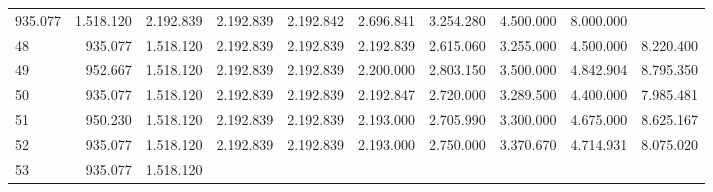 \begin{tabular}{llllllllll}
  \multicolumn{1}{|r}{935.077} &
  \multicolumn{1}{r}{1.518.120} &
  \multicolumn{1}{r}{2.192.839} &
  \multicolumn{1}{r}{2.192.839} &
  \multicolumn{1}{r}{2.192.842} &
  \multicolumn{1}{r}{2.696.841} &
  \multicolumn{1}{r}{3.254.280} &
  \multicolumn{1}{r}{4.500.000} &
  \multicolumn{1}{r}{8.000.000} \\
\multicolumn{1}{l}{\hspace{1em}48} &
  \multicolumn{1}{|r}{935.077} &
  \multicolumn{1}{r}{1.518.120} &
  \multicolumn{1}{r}{2.192.839} &
  \multicolumn{1}{r}{2.192.839} &
  \multicolumn{1}{r}{2.192.839} &
  \multicolumn{1}{r}{2.615.060} &
  \multicolumn{1}{r}{3.255.000} &
  \multicolumn{1}{r}{4.500.000} &
  \multicolumn{1}{r}{8.220.400} \\
\multicolumn{1}{l}{\hspace{1em}49} &
  \multicolumn{1}{|r}{952.667} &
  \multicolumn{1}{r}{1.518.120} &
  \multicolumn{1}{r}{2.192.839} &
  \multicolumn{1}{r}{2.192.839} &
  \multicolumn{1}{r}{2.200.000} &
  \multicolumn{1}{r}{2.803.150} &
  \multicolumn{1}{r}{3.500.000} &
  \multicolumn{1}{r}{4.842.904} &
  \multicolumn{1}{r}{8.795.350} \\
\multicolumn{1}{l}{\hspace{1em}50} &
  \multicolumn{1}{|r}{935.077} &
  \multicolumn{1}{r}{1.518.120} &
  \multicolumn{1}{r}{2.192.839} &
  \multicolumn{1}{r}{2.192.839} &
  \multicolumn{1}{r}{2.192.847} &
  \multicolumn{1}{r}{2.720.000} &
  \multicolumn{1}{r}{3.289.500} &
  \multicolumn{1}{r}{4.400.000} &
  \multicolumn{1}{r}{7.985.481} \\
\multicolumn{1}{l}{\hspace{1em}51} &
  \multicolumn{1}{|r}{950.230} &
  \multicolumn{1}{r}{1.518.120} &
  \multicolumn{1}{r}{2.192.839} &
  \multicolumn{1}{r}{2.192.839} &
  \multicolumn{1}{r}{2.193.000} &
  \multicolumn{1}{r}{2.705.990} &
  \multicolumn{1}{r}{3.300.000} &
  \multicolumn{1}{r}{4.675.000} &
  \multicolumn{1}{r}{8.625.167} \\
\multicolumn{1}{l}{\hspace{1em}52} &
  \multicolumn{1}{|r}{935.077} &
  \multicolumn{1}{r}{1.518.120} &
  \multicolumn{1}{r}{2.192.839} &
  \multicolumn{1}{r}{2.192.839} &
  \multicolumn{1}{r}{2.193.000} &
  \multicolumn{1}{r}{2.750.000} &
  \multicolumn{1}{r}{3.370.670} &
  \multicolumn{1}{r}{4.714.931} &
  \multicolumn{1}{r}{8.075.020} \\
\multicolumn{1}{l}{\hspace{1em}53} &
  \multicolumn{1}{|r}{935.077} &
  \multicolumn{1}{r}{1.518.120} &

\end{tabular}
